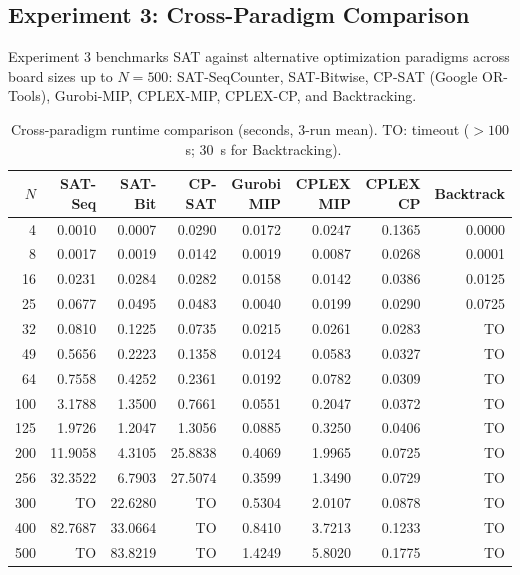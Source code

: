 \documentclass[a4paper,fleqn]{cas-sc}
\begin{document}
\subsection{Experiment 3: Cross-Paradigm Comparison}
\label{sec:exp3_results}

Experiment 3 benchmarks SAT against alternative optimization paradigms across board sizes up to $N = 500$: SAT-SeqCounter, SAT-Bitwise, CP-SAT (Google OR-Tools), Gurobi-MIP, CPLEX-MIP, CPLEX-CP, and Backtracking.

\begin{table}[pos=!htb]
\centering\footnotesize
\renewcommand{\arraystretch}{0.78}
\setlength{\tabcolsep}{3.6pt}
\caption{Cross-paradigm runtime comparison (seconds, 3-run mean). TO: timeout ($>100$~s; 30~s for Backtracking).}
\label{tab:exp3_paradigms}
\begin{tabular}{rrrrrrrr}
\toprule
$N$ & SAT-Seq & SAT-Bit & CP-SAT & Gurobi MIP & CPLEX MIP & CPLEX CP & Backtrack \\
\midrule
4   & 0.0010 & 0.0007 & 0.0290 & 0.0172 & 0.0247 & 0.1365 & 0.0000 \\
8   & 0.0017 & 0.0019 & 0.0142 & 0.0019 & 0.0087 & 0.0268 & 0.0001 \\
16  & 0.0231 & 0.0284 & 0.0282 & 0.0158 & 0.0142 & 0.0386 & 0.0125 \\
25  & 0.0677 & 0.0495 & 0.0483 & 0.0040 & 0.0199 & 0.0290 & 0.0725 \\
32  & 0.0810 & 0.1225 & 0.0735 & 0.0215 & 0.0261 & 0.0283 & TO \\
49  & 0.5656 & 0.2223 & 0.1358 & 0.0124 & 0.0583 & 0.0327 & TO \\
64  & 0.7558 & 0.4252 & 0.2361 & 0.0192 & 0.0782 & 0.0309 & TO \\
100 & 3.1788 & 1.3500 & 0.7661 & 0.0551 & 0.2047 & 0.0372 & TO \\
125 & 1.9726 & 1.2047 & 1.3056 & 0.0885 & 0.3250 & 0.0406 & TO \\
200 & 11.9058& 4.3105 & 25.8838& 0.4069 & 1.9965 & 0.0725 & TO \\
256 & 32.3522& 6.7903 & 27.5074& 0.3599 & 1.3490 & 0.0729 & TO \\
300 & TO     & 22.6280& TO     & 0.5304 & 2.0107 & 0.0878 & TO \\
400 & 82.7687& 33.0664& TO     & 0.8410 & 3.7213 & 0.1233 & TO \\
500 & TO     & 83.8219& TO     & 1.4249 & 5.8020 & 0.1775 & TO \\
\bottomrule
\end{tabular}
\end{table}
\end{document}
